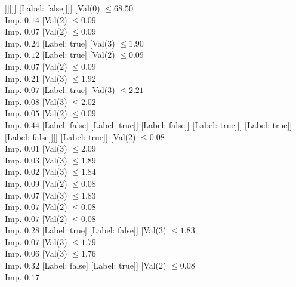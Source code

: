 \documentclass[margin=10pt]{standalone}
\begin{document}
\begin{forest}
								[Label: true]
								[Val($3$) $ \leq 2.35$ \\ Imp. $0.01$
									[Label: false]
									[Val($2$) $ \leq 0.05$ \\ Imp. $0.00$
										[Label: true]
										[Val($2$) $ \leq 0.05$ \\ Imp. $0.05$
											[Label: false]
											[Label: true]]]]]]
						[Label: false]]]]
			[Val($0$) $ \leq 68.50$ \\ Imp. $0.14$
				[Val($2$) $ \leq 0.09$ \\ Imp. $0.07$
					[Val($2$) $ \leq 0.09$ \\ Imp. $0.24$
						[Label: true]
						[Val($3$) $ \leq 1.90$ \\ Imp. $0.12$
							[Label: true]
							[Val($2$) $ \leq 0.09$ \\ Imp. $0.07$
								[Val($2$) $ \leq 0.09$ \\ Imp. $0.21$
									[Val($3$) $ \leq 1.92$ \\ Imp. $0.07$
										[Label: true]
										[Val($3$) $ \leq 2.21$ \\ Imp. $0.08$
											[Val($3$) $ \leq 2.02$ \\ Imp. $0.05$
												[Val($2$) $ \leq 0.09$ \\ Imp. $0.44$
													[Label: false]
													[Label: true]]
												[Label: false]]
											[Label: true]]]
									[Label: true]]
								[Label: false]]]]
					[Label: true]]
				[Val($2$) $ \leq 0.08$ \\ Imp. $0.01$
					[Val($3$) $ \leq 2.09$ \\ Imp. $0.03$
						[Val($3$) $ \leq 1.89$ \\ Imp. $0.02$
							[Val($3$) $ \leq 1.84$ \\ Imp. $0.09$
								[Val($2$) $ \leq 0.08$ \\ Imp. $0.07$
									[Val($3$) $ \leq 1.83$ \\ Imp. $0.07$
										[Val($2$) $ \leq 0.08$ \\ Imp. $0.07$
											[Val($2$) $ \leq 0.08$ \\ Imp. $0.28$
												[Label: true]
												[Label: false]]
											[Val($3$) $ \leq 1.83$ \\ Imp. $0.07$
												[Val($3$) $ \leq 1.79$ \\ Imp. $0.06$
													[Val($3$) $ \leq 1.76$ \\ Imp. $0.32$
														[Label: false]
														[Label: true]]
													[Val($2$) $ \leq 0.08$ \\ Imp. $0.17$

\end{forest}
\end{document}
